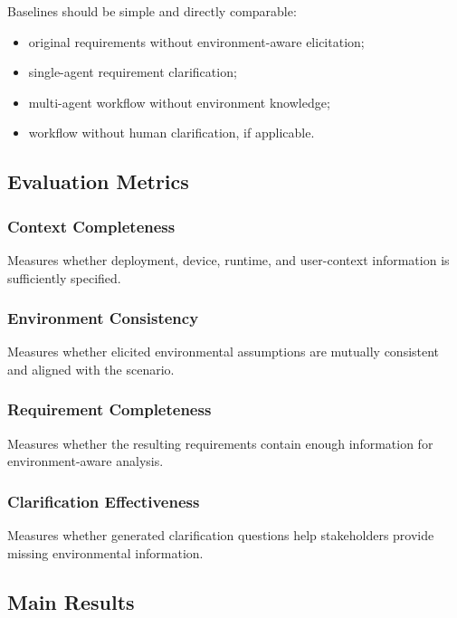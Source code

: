 Baselines should be simple and directly comparable:
\begin{itemize}[leftmargin=*]
  \item original requirements without environment-aware elicitation;
  \item single-agent requirement clarification;
  \item multi-agent workflow without environment knowledge;
  \item workflow without human clarification, if applicable.
\end{itemize}

\subsection{Evaluation Metrics}
\label{exp:metrics}

\subsubsection{Context Completeness}
\label{exp:context_completeness}

Measures whether deployment, device, runtime, and user-context information is sufficiently specified.

\subsubsection{Environment Consistency}
\label{exp:environment_consistency}

Measures whether elicited environmental assumptions are mutually consistent and aligned with the scenario.

\subsubsection{Requirement Completeness}
\label{exp:requirement_completeness}

Measures whether the resulting requirements contain enough information for environment-aware analysis.

\subsubsection{Clarification Effectiveness}
\label{exp:clarification_effectiveness}

Measures whether generated clarification questions help stakeholders provide missing environmental information.

\subsection{Main Results}
\label{exp:main_results}

